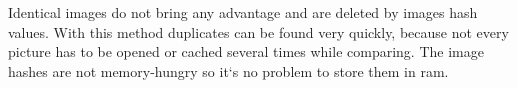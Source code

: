 \documentclass[../ImageClassifier.tex]{subfiles}
\begin{document}
    Identical images do not bring any advantage and are deleted by images hash values.
    With this method duplicates can be found very quickly, because not every picture has to be opened or cached several times while comparing.
    The image hashes are not memory-hungry so it`s no problem to store them in \ac{ram}.
\end{document}
